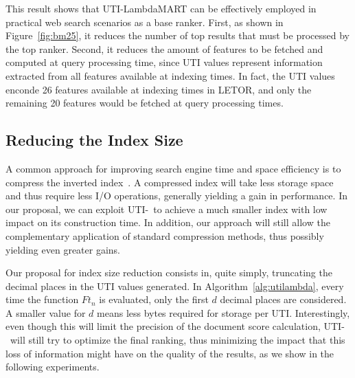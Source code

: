 \documentclass[preprint,review,10pt,3p]{elsarticle}
\begin{document}
This result shows that UTI-LambdaMART can be effectively employed 
in practical web search scenarios as a base ranker.
First, as shown in Figure~\ref{fig:bm25}, it reduces the number of top results that must be processed by the top ranker. 
Second, it reduces the amount of features to be fetched and computed at query processing time, since UTI values represent information extracted from all features available at indexing times. In fact, the UTI values enconde 26 features available at indexing times in LETOR, and only the remaining 20 features would be fetched at query processing times.


\subsection{Reducing the Index Size}
\label{sec:compression}

A common approach for improving search engine time and space efficiency is to compress the inverted index~\cite{baezaribeiro2011modinforet}. A compressed index will take less storage space and thus require less I/O operations, generally yielding a gain in performance. In our proposal, we can exploit UTI-\lambdamart\ to achieve a much smaller index with low impact on its construction time. In addition, our approach will still allow the complementary application of standard compression methods, thus possibly yielding even greater gains.

Our proposal for index size reduction consists in, quite simply, truncating the decimal places in the UTI values generated. In Algorithm~\ref{alg:utilambda}, every time the function $Ft_n$ is evaluated, only the first $d$ decimal places are considered. A smaller value for $d$ means less bytes required for storage per UTI. Interestingly, even though this will limit the precision of the document score calculation, UTI-\lamdamart\ will still try to optimize the final ranking, thus minimizing the impact that this loss of information might have on the quality of the results, as we show in the following experiments.

\end{document}
